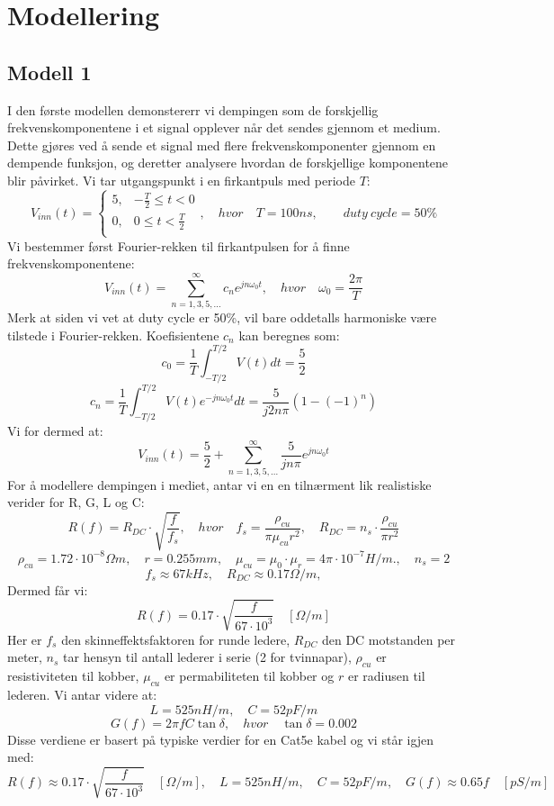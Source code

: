 \section{Modellering}
\subsection{Modell 1}
I den første modellen demonstererr vi dempingen som de forskjellig frekvenskomponentene i et signal opplever når det sendes gjennom et medium. Dette gjøres ved å sende et signal med flere frekvenskomponenter gjennom en dempende funksjon, og deretter analysere hvordan de forskjellige komponentene blir påvirket.
Vi tar utgangspunkt i en firkantpuls med periode $T$:
\[
    V_{inn}(t) = \begin{cases}
        5, & -\frac{T}{2} \leq t < 0 \\
        0, & 0 \leq t < \frac{T}{2} \\
    \end{cases}, \quad hvor \quad T = 100ns,\qquad duty\ cycle = 50\%
\]
Vi bestemmer først Fourier-rekken til firkantpulsen for å finne frekvenskomponentene:
\[
    V_{inn}(t) = \sum_{n=1,3,5,...}^{\infty} c_n e^{j n \omega_0 t}, \quad hvor \quad \omega_0 = \frac{2\pi}{T}
\]
Merk at siden vi vet at duty cycle er 50\%, vil bare oddetalls harmoniske være tilstede i Fourier-rekken.
Koefisientene $c_n$ kan beregnes som:
\[
    c_0 = \frac{1}{T} \int_{-T/2}^{T/2} V(t) dt = \frac{5}{2}
\]
\[
    c_n = \frac{1}{T} \int_{-T/2}^{T/2} V(t) e^{-j n \omega_0 t} dt =  \frac{5}{j 2 n \pi} (1 - (-1)^n)
\]
Vi for dermed at:
\[
    V_{inn}(t) = \frac{5}{2} + \sum_{n=1,3,5,...}^{\infty} \frac{5}{j n \pi} e^{j n \omega_0 t}
\]
For å modellere dempingen i mediet, antar vi en en tilnærment lik realistiske verider for R, G, L og C:
\[
    R(f) = R_{DC} \cdot \sqrt{\frac{f}{f_{s}}}, \quad hvor \quad f_{s} = \frac{\rho_{cu}}{\pi \mu_{cu} r^2}, \quad R_{DC} = n_s \cdot \frac{\rho_{cu}}{\pi r^2}
\]
\[
    \rho_{cu} = 1.72 \cdot 10^{-8} \Omega m, \quad r = 0.255 mm, \quad \mu_{cu} = \mu_0 \cdot \mu_r = 4\pi \cdot 10^{-7} H/m., \quad n_s = 2
\]
\[
    f_s \approx 67kHz, \quad R_{DC} \approx 0.17 \Omega/m,
\]
Dermed får vi:
\[
    R(f) = 0.17 \cdot \sqrt{\frac{f}{67 \cdot 10^3}} \quad [\Omega/m]
\]
Her er $f_s$ den skinneffektsfaktoren for runde ledere, $R_{DC}$ den DC motstanden per meter, $n_s$ tar hensyn til antall lederer i serie (2 for tvinnapar), $\rho_{cu}$ er resistiviteten til kobber, $\mu_{cu}$ er permabiliteten til kobber og $r$ er radiusen til lederen.
Vi antar videre at:
\[
    L = 525 nH/m, \quad C = 52 pF/m
\]
\[
    G(f) = 2\pi f C \tan \delta, \quad hvor \quad \tan \delta = 0.002
\]
Disse verdiene er basert på typiske verdier for en Cat5e kabel og vi står igjen med:
\[
    R(f) \approx 0.17 \cdot \sqrt{\frac{f}{67 \cdot 10^3}} \quad [\Omega/m], \quad L = 525 nH/m, \quad C = 52 pF/m, \quad G(f) \approx 0.65f \quad [pS/m]
\]
\clearpage


